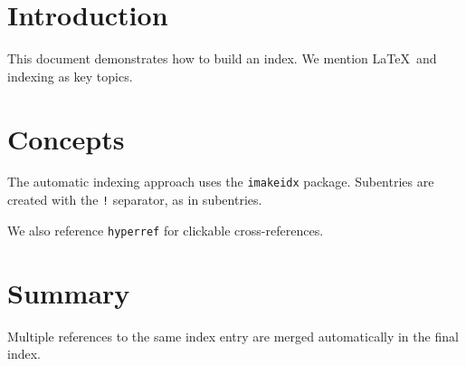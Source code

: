 \documentclass[11pt]{article}
\begin{document}
\section{Introduction}
This document demonstrates how to build an index.
We mention LaTeX\ and indexing
as key topics.

\section{Concepts}
The automatic indexing approach
uses the \texttt{imakeidx} package.
Subentries are created with the \texttt{!} separator, as in
subentries.

We also reference \texttt{hyperref} for
clickable cross-references.

\section{Summary}
Multiple references to the same
index entry are merged automatically in the final index.

\printindex
\end{document}
